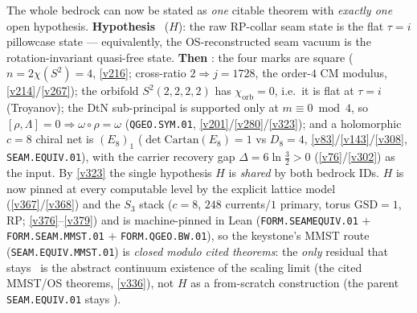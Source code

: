\documentclass[11pt,a4paper]{article}
\begin{document}
\begin{keybox}
The whole bedrock can now be stated as \emph{one} citable theorem with \emph{exactly one} open hypothesis.
\textbf{Hypothesis} \mO\ ($H$): the raw RP-collar seam state is the flat $\tau{=}i$ pillowcase state ---
equivalently, the OS-reconstructed seam vacuum is the rotation-invariant quasi-free state. \textbf{Then} \mE:
the four marks are square ($n{=}2\chi(S^2){=}4$, \vref{v216}; cross-ratio $2\Rightarrow j{=}1728$, the order-$4$
CM modulus, \vref{v214}/\vref{v267}); the orbifold $S^2(2,2,2,2)$ has $\chi_{\mathrm{orb}}{=}0$, i.e.\ it is flat
at $\tau{=}i$ (Troyanov); the DtN sub-principal is supported only at $m\equiv0\bmod4$, so
$[\rho,\Lambda]{=}0\Rightarrow\omega\circ\rho{=}\omega$ (\texttt{QGEO.SYM.01}, \vref{v201}/\vref{v280}/\vref{v323});
and a holomorphic $c{=}8$ chiral net is $(E_8)_1$ ($\det\mathrm{Cartan}(E_8){=}1$ vs $D_8{=}4$,
\vref{v83}/\vref{v143}/\vref{v308}, \texttt{SEAM.EQUIV.01}), with the carrier recovery gap
$\Delta{=}6\ln\tfrac32>0$ (\vref{v76}/\vref{v302}) as the input. By \vref{v323} the single hypothesis $H$ is
\emph{shared} by both bedrock IDs. $H$ is now pinned at every computable level by the explicit lattice model
(\vref{v367}/\vref{v368}) and the $S_3$ stack ($c{=}8$, $248$ currents/$1$ primary, torus $\mathrm{GSD}{=}1$, RP;
\vref{v376}--\vref{v379}) and is machine-pinned in Lean (\texttt{FORM.SEAMEQUIV.01} $+$ \texttt{FORM.SEAM.MMST.01}
$+$ \texttt{FORM.QGEO.BW.01}), so the keystone's MMST route (\texttt{SEAM.EQUIV.MMST.01}) is \emph{closed modulo
cited theorems}: the \emph{only} residual that
stays \mO\ is the abstract continuum existence of the scaling limit (the cited MMST/OS theorems, \vref{v336}), not
$H$ as a from-scratch construction (the parent \texttt{SEAM.EQUIV.01} stays \mO).
\end{keybox}
\end{document}
